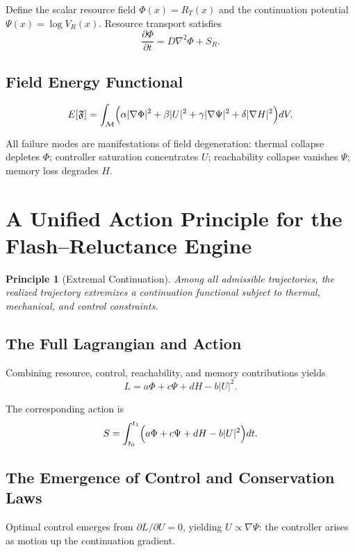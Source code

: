 \documentclass[12pt,a4paper]{article}
\newtheorem*{principle}{Principle}
\newcommand{\M}{\mathcal{M}}
\begin{document}
Define the scalar resource field $\Phi(x) = R_T(x)$ and the continuation potential $\Psi(x) = \log V_R(x)$. Resource transport satisfies
\[
\frac{\partial \Phi}{\partial t} = D\nabla^2\Phi + S_R.
\]

\subsection{Field Energy Functional}

\[
E[\mathfrak{F}] = \int_{\M} \Bigl( \alpha|\nabla\Phi|^2 + \beta|U|^2 + \gamma|\nabla\Psi|^2 + \delta|\nabla H|^2 \Bigr) dV.
\]

All failure modes are manifestations of field degeneration: thermal collapse depletes $\Phi$; controller saturation concentrates $U$; reachability collapse vanishes $\Psi$; memory loss degrades $H$.

\section{A Unified Action Principle for the Flash--Reluctance Engine}

\begin{principle}[Extremal Continuation]
Among all admissible trajectories, the realized trajectory extremizes a continuation functional subject to thermal, mechanical, and control constraints.
\end{principle}

\subsection{The Full Lagrangian and Action}

Combining resource, control, reachability, and memory contributions yields
\[
L = a\Phi + c\Psi + dH - b|U|^2.
\]

The corresponding action is
\[
S = \int_{t_0}^{t_1} \Bigl( a\Phi + c\Psi + dH - b|U|^2 \Bigr) dt.
\]

\subsection{The Emergence of Control and Conservation Laws}

Optimal control emerges from $\partial L/\partial U = 0$, yielding $U \propto \nabla\Psi$: the controller arises as motion up the continuation gradient.
\end{document}
